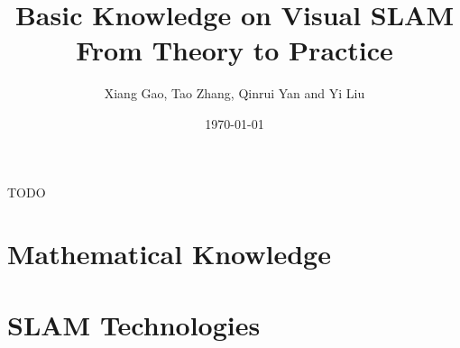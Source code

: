 \documentclass[a4paper,9pt,openleft]{book}
\begin{document}
\title{Basic Knowledge on Visual SLAM\\From Theory to Practice}
\author{Xiang Gao, Tao Zhang, Qinrui Yan and Yi Liu}
\date{\today}

\frontmatter
\maketitle




\tableofcontents

 TODO



\mainmatter 
{}
\hypersetup{bookmarksdepth=2}



\part{Mathematical Knowledge}






\part{SLAM Technologies}









\appendix
{}
\hypersetup{bookmarksdepth=2}




\backmatter
\small


\newpage
\end{document}
